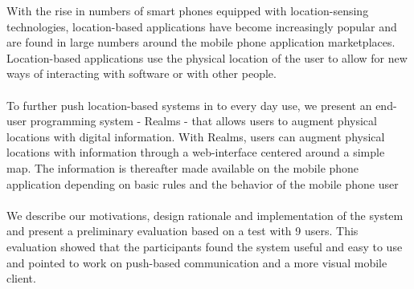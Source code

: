 \noindent With the rise in numbers of smart phones equipped with location-sensing technologies, location-based applications have become increasingly popular and are found in large numbers around the mobile phone application marketplaces. Location-based applications use the physical location of the user to allow for new ways of interacting with software or with other people.
\\\\
To further push location-based systems in to every day use, we present an end-user programming system - Realms - that allows users to augment physical locations with digital information. With Realms, users can augment physical locations with information through a web-interface centered around a simple map. The information is thereafter made available on the mobile phone application depending on basic rules and the behavior of the mobile phone user
\\\\
We describe our motivations, design rationale and implementation of the system and present a preliminary evaluation based on a test with 9 users. This evaluation showed that the participants found the system useful and easy to use and pointed to work on push-based communication and a more visual mobile client.